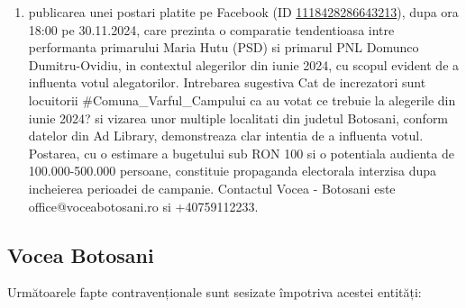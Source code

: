 \documentclass[a4paper,12pt]{article}
\begin{document}
\begin{enumerate}[leftmargin=*, label=\arabic*.)]
    \item publicarea unei postari platite pe Facebook (ID \href{https://www.facebook.com/ads/library/?id=1118428286643213}{1118428286643213}), dupa ora 18:00 pe 30.11.2024, care prezinta o comparatie tendentioasa intre performanta primarului Maria Hutu (PSD) si primarul PNL Domunco Dumitru-Ovidiu, in contextul alegerilor din iunie 2024, cu scopul evident de a influenta votul alegatorilor.  Intrebarea sugestiva Cat de increzatori sunt locuitorii \#Comuna\_Varful\_Campului ca au votat ce trebuie la alegerile din iunie 2024?  si vizarea unor multiple localitati din judetul Botosani, conform datelor din Ad Library, demonstreaza clar intentia de a influenta votul.  Postarea, cu o estimare a bugetului sub RON 100 si o potentiala audienta de 100.000-500.000 persoane, constituie propaganda electorala interzisa dupa incheierea perioadei de campanie.  Contactul Vocea - Botosani este office@voceabotosani.ro si +40759112233.
\end{enumerate}

\vspace{0.5cm}

\subsection{Vocea Botosani}
Următoarele fapte contravenționale sunt sesizate împotriva acestei entități:
\end{document}
